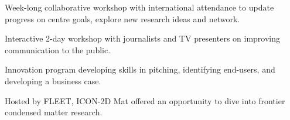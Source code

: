 \documentclass[10pt,a4paper,ragged2e,withhyper]{altacv}
\begin{document}
		\divider
		
		Week-long collaborative workshop with international attendance to update progress on centre goals, explore new research ideas and network.
		
		\divider
		
		Interactive 2-day workshop with journalists and TV presenters on improving communication to the public.
		
		\divider
		
		\vspace{-0.3em}
		
		\divider
		
		Innovation program developing skills in pitching, identifying end-users, and developing a business case.
		
		\divider
		
%		
%		
		Hosted by FLEET, ICON-2D Mat offered an opportunity to dive into frontier condensed matter research.
		
		\divider
%		
%		
%		
		
		
	
\end{document}
